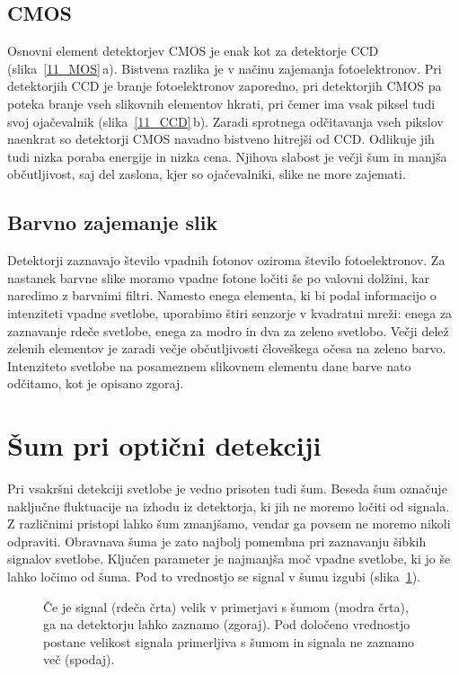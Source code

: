 \subsection*{CMOS}
Osnovni element detektorjev CMOS je enak kot za detektorje CCD (slika~\ref{11_MOS}\,a). 
Bistvena razlika je v načinu zajemanja fotoelektronov. Pri detektorjih CCD je branje 
fotoelektronov zaporedno, pri detektorjih CMOS pa poteka branje vseh slikovnih elementov 
hkrati, pri čemer ima vsak piksel tudi svoj ojačevalnik (slika~\ref{11_CCD}\,b).
Zaradi sprotnega odčitavanja vseh pikslov naenkrat so detektorji CMOS navadno bistveno hitrejši 
od CCD. Odlikuje jih tudi nizka poraba energije in nizka cena. Njihova slabost
je večji šum in manjša občutljivost, saj del zaslona, kjer so ojačevalniki, slike ne more
zajemati. 

\subsection*{Barvno zajemanje slik}
Detektorji zaznavajo število vpadnih fotonov oziroma število fotoelektronov.
Za nastanek barvne slike moramo vpadne fotone ločiti še po valovni dolžini, kar naredimo
z barvnimi filtri. Namesto enega elementa, ki bi podal informacijo o intenziteti vpadne 
svetlobe, uporabimo štiri senzorje v kvadratni mreži: enega za zaznavanje rdeče svetlobe,
enega za modro in dva za zeleno svetlobo.
Večji delež zelenih elementov je zaradi večje občutljivosti človeškega očesa na zeleno barvo. 
Intenziteto svetlobe na posameznem slikovnem elementu dane barve nato odčitamo, kot je
opisano zgoraj.
 
\section{Šum pri optični detekciji}
\label{chap:sum}
Pri vsakršni detekciji svetlobe je vedno prisoten tudi šum. Beseda šum označuje naključne 
fluktuacije na izhodu iz detektorja, ki jih ne moremo ločiti od signala. Z različnimi 
pristopi lahko šum zmanjšamo, vendar ga povsem ne moremo nikoli odpraviti. Obravnava 
šuma je zato najbolj pomembna pri zaznavanju šibkih signalov svetlobe. Ključen
parameter je najmanjša moč vpadne svetlobe, ki jo še lahko ločimo od šuma. Pod to vrednostjo 
se signal v šumu izgubi (slika~\ref{11_sum}).
\begin{figure}[h]
\centering
\def\svgwidth{140truemm} 

\caption{Če je signal (rdeča črta) velik v primerjavi s šumom (modra črta), 
ga na detektorju lahko zaznamo (zgoraj). 
Pod določeno vrednostjo postane velikost signala primerljiva s šumom in signala ne zaznamo več
(spodaj).}
\label{11_sum}
\end{figure}

